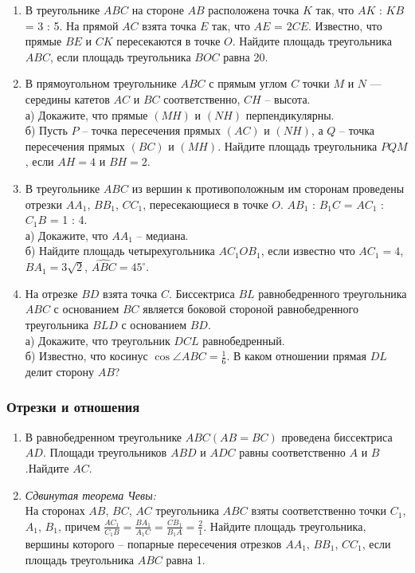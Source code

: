 \documentclass[12pt]{article}
\begin{document}
    \begin{enumerate}[start=1,label={\itshape\bfseries \arabic*.}]
    \item В треугольнике $ABC$ на стороне $AB$ расположена точка $K$ так, что $AK$ : $KB$ = 3 : 5. На прямой $AC$ взята точка $E$ так, что $AE$ = $2CE$. Известно, что прямые $BE$ и $CK$ пересекаются в точке $O$. Найдите площадь треугольника $ABC$, если площадь треугольника $BOC$ равна 20.
    \item В прямоугольном треугольнике $ABC$ с прямым углом $C$ точки $M$ и $N$ — середины катетов $AC$ и $BC$ соответственно, $CH$ -- высота.\\
    а) Докажите, что прямые $(MH)$ и $(NH)$ перпендикулярны.\\
    б) Пусть $P$ -- точка пересечения прямых $(AC)$ и $(NH)$, а $Q$ -- точка пересечения прямых $(BC)$ и $(MH)$. Найдите площадь треугольника $PQM$, если $AH = 4$ и $BH = 2$.

    \item В треугольнике $ABC$ из вершин к противоположным им сторонам проведены отрезки $AA_1$, $BB_1$, $CC_1$, пересекающиеся в точке $O$. $AB_1$ : $B_1C$ = $AC_1$ : $C_1B$ = 1 : 4.\\
    а) Докажите, что $AA_1$ -- медиана.\\
    б) Найдите площадь четырехугольника $AC_1OB_1$, если известно что $AC_1 = 4$, $BA_1 = 3\sqrt{2}$, $\widehat{ABC} = 45^{\circ}$.

    \item На отрезке $BD$ взята точка $C$. Биссектриса $BL$ равнобедренного треугольника $ABC$ с основанием $BC$ является боковой стороной равнобедренного треугольника $BLD$ с основанием $BD$.\\
    а) Докажите, что треугольник $DCL$ равнобедренный.\\
    б) Известно, что  косинус $\cos{\angle ABC} = \frac{1}{6}$. В каком отношении прямая $DL$ делит сторону $AB$?

    \end{enumerate}

    \subsubsection*{Отрезки и отношения}
     \begin{enumerate}[start=1,label={\itshape\bfseries \arabic*.}]
        \item В равнобедренном треугольнике $ABC (AB = BC)$ проведена биссектриса $AD$. Площади треугольников $ABD$ и $ADC$ равны соответственно $A$ и $B$.Найдите $AC$.
        \item \textit{Сдвинутая теорема Чевы:}\\
        На сторонах $AB$, $BC$, $AC$ треугольника $ABC$ взяты соответственно точки $C_1$, $A_1$, $B_1$, причем $\frac{AC_1}{C_1B} = \frac{BA_1}{A_1C} = \frac{CB_1}{B_1A} = \frac{2}{1}$. Найдите площадь треугольника, вершины которого -- попарные пересечения отрезков $AA_1$, $BB_1$, $CC_1$, если площадь треугольника $ABC$ равна 1.
     \end{enumerate}
\end{document}
